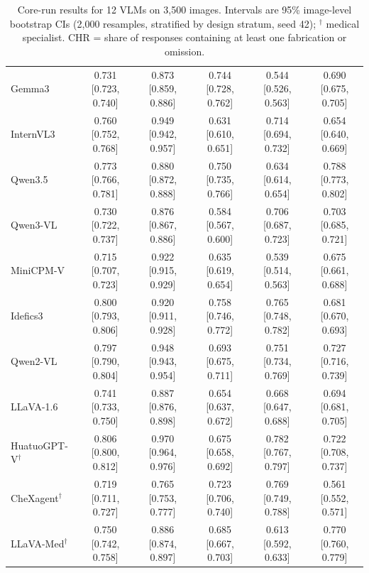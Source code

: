 \begin{table}[t]
\begin{tabular}{lccccc}
Gemma3 & 0.731 [0.723, 0.740] & 0.873 [0.859, 0.886] & 0.744 [0.728, 0.762] & 0.544 [0.526, 0.563] & 0.690 [0.675, 0.705] \\
InternVL3 & 0.760 [0.752, 0.768] & 0.949 [0.942, 0.957] & 0.631 [0.610, 0.651] & 0.714 [0.694, 0.732] & 0.654 [0.640, 0.669] \\
Qwen3.5 & 0.773 [0.766, 0.781] & 0.880 [0.872, 0.888] & 0.750 [0.735, 0.766] & 0.634 [0.614, 0.654] & 0.788 [0.773, 0.802] \\
Qwen3-VL & 0.730 [0.722, 0.737] & 0.876 [0.867, 0.886] & 0.584 [0.567, 0.600] & 0.706 [0.687, 0.723] & 0.703 [0.685, 0.721] \\
MiniCPM-V & 0.715 [0.707, 0.723] & 0.922 [0.915, 0.929] & 0.635 [0.619, 0.654] & 0.539 [0.514, 0.563] & 0.675 [0.661, 0.688] \\
Idefics3 & 0.800 [0.793, 0.806] & 0.920 [0.911, 0.928] & 0.758 [0.746, 0.772] & 0.765 [0.748, 0.782] & 0.681 [0.670, 0.693] \\
Qwen2-VL & 0.797 [0.790, 0.804] & 0.948 [0.943, 0.954] & 0.693 [0.675, 0.711] & 0.751 [0.734, 0.769] & 0.727 [0.716, 0.739] \\
LLaVA-1.6 & 0.741 [0.733, 0.750] & 0.887 [0.876, 0.898] & 0.654 [0.637, 0.672] & 0.668 [0.647, 0.688] & 0.694 [0.681, 0.705] \\
HuatuoGPT-V$^{\dagger}$ & 0.806 [0.800, 0.812] & 0.970 [0.964, 0.976] & 0.675 [0.658, 0.692] & 0.782 [0.767, 0.797] & 0.722 [0.708, 0.737] \\
CheXagent$^{\dagger}$ & 0.719 [0.711, 0.727] & 0.765 [0.753, 0.777] & 0.723 [0.706, 0.740] & 0.769 [0.749, 0.788] & 0.561 [0.552, 0.571] \\
LLaVA-Med$^{\dagger}$ & 0.750 [0.742, 0.758] & 0.886 [0.874, 0.897] & 0.685 [0.667, 0.703] & 0.613 [0.592, 0.633] & 0.770 [0.760, 0.779] \\
\bottomrule
\end{tabular}
\caption{Core-run results for 12 VLMs on 3,500 images. Intervals are 95\% image-level bootstrap CIs (2,000 resamples, stratified by design stratum, seed 42); $^{\dagger}$ medical specialist. CHR = share of responses containing at least one fabrication or omission.}
\label{tab:main}
\end{table}
